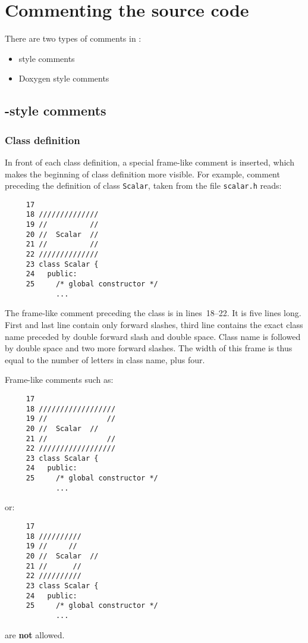 \clearpage
\section{Commenting the source code}
\label{sec:commenting}

There are two types of comments in {\psiboil}:
\begin{itemize}
  \item {\psiboil} style comments
  \item Doxygen style comments
\end{itemize}

\subsection{{\psiboil}-style comments}

\subsubsection{Class definition}

In front of each class definition, a special frame-like comment is inserted, which
makes the beginning of class definition more visible. For example, comment 
preceding the definition of class {\tt Scalar}, taken from the file {\tt scalar.h}
reads:
%
{\small \begin{verbatim}
     17
     18 //////////////
     19 //          //
     20 //  Scalar  //
     21 //          //
     22 //////////////
     23 class Scalar {
     24   public:
     25     /* global constructor */
            ...
\end{verbatim}}
% 
The frame-like comment preceding the class is in lines~18--22. It is five lines
long. First and last line contain only forward slashes, third line contains the
exact class name preceded by double forward slash and double space. Class name
is followed by double space and two more forward slashes. The width of this frame
is thus equal to the number of letters in class name, plus four.

Frame-like comments such as:
%
{\small \begin{verbatim}
     17
     18 //////////////////
     19 //              //
     20 //  Scalar  //
     21 //              //
     22 //////////////////
     23 class Scalar {
     24   public:
     25     /* global constructor */
            ...
\end{verbatim}}
% 
or:
%
{\small \begin{verbatim}
     17
     18 //////////
     19 //     //
     20 //  Scalar  //
     21 //      //
     22 //////////
     23 class Scalar {
     24   public:
     25     /* global constructor */
            ...
\end{verbatim}}
% 
are {\bf not} allowed.


